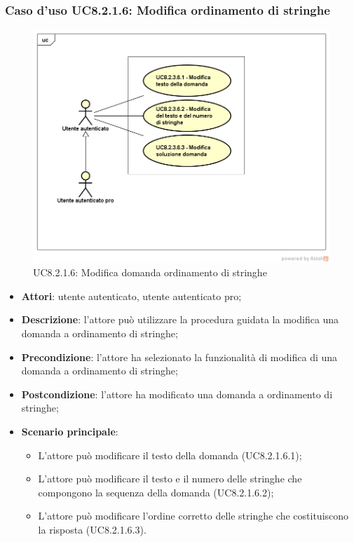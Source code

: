 \subsubsection{Caso d’uso UC8.2.1.6: Modifica ordinamento di stringhe}
	\label{UC8.2.1.6}
	\begin{figure}[h]
		\centering
		\includegraphics[scale=0.45,keepaspectratio]{UML/UC8_2_3_6.png}
		\caption{UC8.2.1.6: Modifica domanda ordinamento di stringhe}
	\end{figure}
	\FloatBarrier
\begin{itemize}
	\item\textbf{Attori}: utente autenticato, utente autenticato pro;
	\item\textbf{Descrizione}: l'attore può utilizzare la procedura guidata la modifica una domanda a ordinamento di stringhe;
	\item\textbf{Precondizione}: l'attore ha selezionato la funzionalità di modifica di una domanda a ordinamento di stringhe;
	\item \textbf{Postcondizione}: l'attore ha modificato una domanda a ordinamento di stringhe;
	\item\textbf{Scenario principale}:
		\begin{itemize}
			\item L'attore può modificare il testo della domanda (UC8.2.1.6.1);
			\item L'attore può modificare il testo e il numero delle stringhe che compongono la sequenza della domanda (UC8.2.1.6.2);
			\item L'attore può modificare l'ordine corretto delle stringhe che costituiscono la risposta (UC8.2.1.6.3).
		\end{itemize}
\end{itemize}

